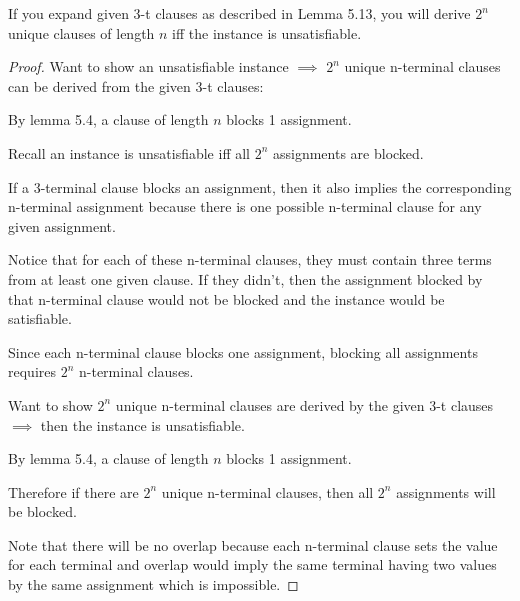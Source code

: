 \documentclass[manuscript]{acmart}
\begin{document}
    \begin{lemma}
        If you expand given 3-t clauses as described in Lemma 5.13, you will
        derive $2^n$ unique clauses of length $n$ iff the instance is unsatisfiable.
    \end{lemma}
    \begin{proof}
        Want to show an unsatisfiable instance $\implies$ $2^n$ unique n-terminal clauses can be derived from the given 3-t clauses:

        By lemma 5.4, a clause of length $n$ blocks 1 assignment. 

        Recall an instance is unsatisfiable iff all $2^n$ assignments are
        blocked.

        If a 3-terminal clause blocks an assignment, then it also implies the corresponding n-terminal assignment because there is one possible n-terminal clause for any given assignment.

        Notice that for each of these n-terminal clauses, they must contain three terms from at least one given clause. If they didn't, then the assignment blocked by that n-terminal clause would not be blocked and the instance would be satisfiable.

        Since each n-terminal clause blocks one assignment, blocking all assignments requires $2^n$ n-terminal clauses.

        Want to show $2^n$ unique n-terminal clauses are derived by the given 3-t clauses $\implies$ then the instance is unsatisfiable.

        By lemma 5.4, a clause of length $n$ blocks 1 assignment. 

        Therefore if there are $2^n$ unique n-terminal clauses, then
        all $2^n$ assignments will be blocked.

        Note that there will be no overlap because each n-terminal clause
        sets the value for each terminal and overlap would imply the same
        terminal having two values by the same assignment which is impossible.
    \end{proof}
\end{document}
